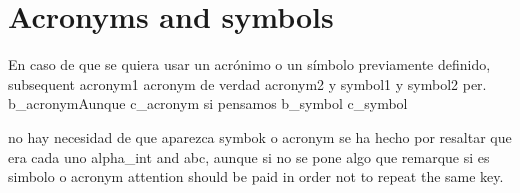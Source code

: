 \section{Acronyms and symbols}\label{sec:Elements_acrosym}
En caso de que se quiera usar un acrónimo o un símbolo previamente definido, subsequent \gls{acronym1} acronym de verdad \gls{acronym2} y \gls{symbol1} y \gls{symbol2} per. \gls{b_acronym}Aunque \gls{c_acronym} si pensamos  \gls{b_symbol}
\gls{c_symbol}

no hay necesidad de que aparezca symbok o acronym se ha hecho por resaltar que era cada uno
\gls{alpha_int} and \gls{abc}, aunque si no se pone algo que remarque si es simbolo o acronym attention should be paid in order not to repeat the same key.